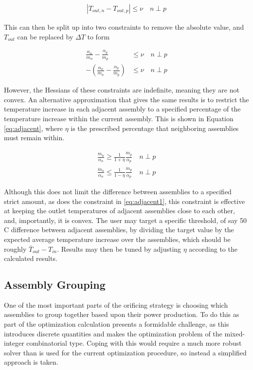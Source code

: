 \documentclass[11pt, oneside]{article}   	%
\begin{document}
\begin{align}
| T_{out,n} - T_{out,p} | \leq \nu \quad n \perp p \label{eq:adjacent1}
\end{align}

This can then be split up into two constraints to remove the absolute value, and $T_{out}$ can be replaced by $\Delta T$ to form

\begin{align}
\frac{\alpha_n}{\dot{m}_n} - \frac{\alpha_p}{\dot{m}_p} & \leq \nu \quad n \perp p \\
-(\frac{\alpha_n}{\dot{m}_n} - \frac{\alpha_p}{\dot{m}_p}) & \leq \nu \quad n \perp p \nonumber
\end{align}

However, the Hessians of these constraints are indefinite, meaning they are not convex. 
An alternative approximation that gives the same results is to restrict the temperature increase in each adjacent assembly to a specified percentage of the temperature increase within the current assembly.
This is shown in Equation \ref{eq:adjacent}, where $\eta$ is the prescribed percentage that neighboring assemblies must remain within.

\begin{align}
\frac{\dot{m}_n}{\alpha_n} \geq \frac{1}{1+\eta} \frac{\dot{m}_p}{\alpha_p} \quad n \perp p \label{eq:adjacent} \\
\frac{\dot{m}_n}{\alpha_n} \leq \frac{1}{1-\eta} \frac{\dot{m}_p}{\alpha_p} \quad n \perp p \nonumber
\end{align}

Although this does not limit the difference between assemblies to a specified strict amount, as does the constraint in \ref{eq:adjacent1}, this constraint is effective at keeping the outlet temperatures of adjacent assemblies close to each other, and, importantly, it is convex.
The user may target a specific threshold, of say 50 C difference between adjacent assemblies, by dividing the target value by the expected average temperature increase over the assemblies, which should be roughly $\bar{T}_{out} - T_{in}$. 
Results may then be tuned by adjusting $\eta$ according to the calculated results.

\subsection{Assembly Grouping}

One of the most important parts of the orificing strategy is choosing which assemblies to group together based upon their power production.
To do this as part of the optimization calculation presents a formidable challenge, as this introduces discrete quantities and makes the optimization problem of the mixed-integer combinatorial type.
Coping with this would require a much more robust solver than is used for the current optimization procedure, so instead a simplified approach is taken.
\end{document}
